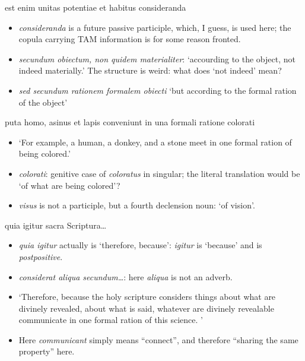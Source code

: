 \documentclass[a4paper, 12pt]{article}
\newcommand{\form}[1]{\emph{#1}}
\newcommand{\translate}[1]{`#1'}
\begin{document}
\begin{exe}
    \ex est enim unitas potentiae et habitus consideranda 
\end{exe}

\begin{itemize}
    \item \form{consideranda} is a future passive participle, 
    which, I guess, is used here; the copula carrying TAM information 
    is for some reason fronted. 
    \item \form{secundum obiectum, non quidem materialiter}:
    \translate{accourding to the object, not indeed materially.} 
    The structure is weird: what does \translate{not indeed} mean?
    \item \form{sed secundum rationem formalem obiecti}
    \translate{but according to the formal ration of the object}
\end{itemize}

\begin{exe}
    \ex puta homo, asinus et lapis conveniunt in una formali ratione colorati
\end{exe}

\begin{itemize}
    \item \translate{For example, a human, a donkey, and a stone meet in one formal ration of being colored.}
    \item \form{colorati}: genitive case of \form{coloratus} in singular; 
    the literal translation would be \translate{of what are being colored}?
    \item \form{visus} is not a participle, but a fourth declension noun: \translate{of vision}.
\end{itemize}

\begin{exe}
    \ex quia igitur sacra Scriptura\dots
\end{exe}

\begin{itemize}
    \item \form{quia igitur} actually is \translate{therefore, because}:
    \form{igitur} is \translate{because} and is \emph{postpositive}.
    \item \form{considerat aliqua secundum\dots}: here \form{aliqua} is not an adverb.
    \item \translate{Therefore, because the holy scripture considers things about what are divinely revealed, 
    about what is said, 
    whatever are divinely revealable communicate in one formal ration 
    of this science.
    }
    \item Here \form{communicant} simply means ``connect'', 
    and therefore ``sharing the same property'' here.
\end{itemize}
\end{document}
